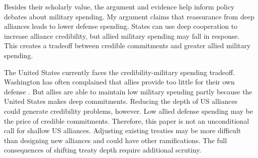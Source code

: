 \documentclass[12pt]{article}
\begin{document}
Besides their scholarly value, the argument and evidence help inform policy debates about military spending. 
My argument claims that reassurance from deep alliances leads to lower defense spending. 
States can use deep cooperation to increase alliance credibility, but allied military spending may fall in response. 
This creates a tradeoff between credible commitments and greater allied military spending. 


The United States currently faces the credibility-military spending tradeoff. 
Washington has often complained that allies provide too little for their own defense \citep{Lanoszka2015}. 
But allies are able to maintain low military spending partly because the United States makes deep commitments. 
Reducing the depth of US alliances could generate credibility problems, however. 
Low allied defense spending may be the price of credible commitments.  
Therefore, this paper is not an unconditional call for shallow US alliances. 
Adjusting existing treaties may be more difficult than designing new alliances and could have other ramifications. 
The full consequences of shifting treaty depth require additional scrutiny. 

 



\singlespace
 
 
\end{document}
